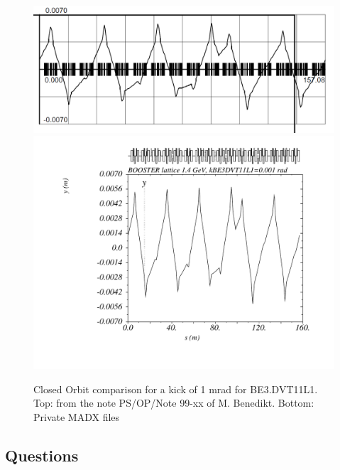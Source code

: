 \documentclass[11pt,letter,english]{article}
\begin{document}
\begin{figure}[!hbtp]
  \begin{center}
    \includegraphics[width=1.0\textwidth]{figs/LINC-BE_DVT11L1.png}
    \includegraphics[width=1.0\textwidth]{figs/psb_orbit_BE3DVT11L1at1mrad.pdf}
    \caption{Closed Orbit comparison for a kick of 1 mrad for BE3.DVT11L1. Top: from the note PS/OP/Note 99-xx of M. Benedikt. Bottom: Private MADX files}
    \label{fig:BE_DVT11L1}
  \end{center}
\end{figure}



\subsection*{Questions}
\end{document}
